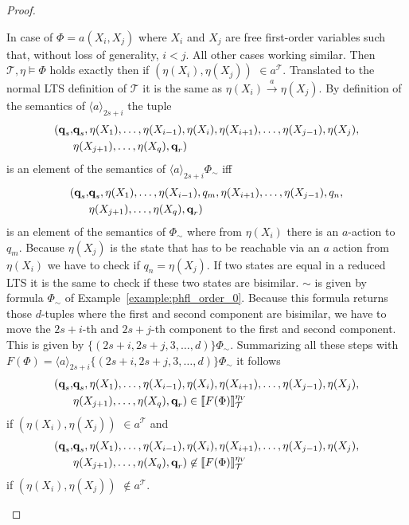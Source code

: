 \begin{proof}
\begin{compactitem}
        \item In case of $\Phi = a(X_i, X_j)$ where $X_i$ and $X_j$ are free first-order variables such that, without loss of generality, $i < j$. All other cases working similar. Then $\mathcal{T}, \eta \models \Phi$ holds exactly then if $(\eta(X_i)
        , \eta(X_j))$ $ \in a^\mathcal{T}$. Translated to the normal LTS definition of $\mathcal{T}$ it is the same as $
        \eta(X_i) \overset{a}{\rightarrow} \eta(X_j)$.
        By  definition of the semantics of $\langle a \rangle_{2s+i}$ the tuple
        \begin{align*}
            (\emph{q}_s, &\emph{q}_s, \eta(X_1), \dots, \eta(X_{i- 1}), \eta(X_{i}), \eta(X_{i+1}), \dots, \eta(X_{j-1}), \eta
            (X_{j}),\\& \eta(X_{j+1}), \dots, \eta(X_q), \emph{q}_r)
        \end{align*}
        is an element of the semantics of $\langle a \rangle_{2s+i} \Phi_\sim$ iff
        \begin{align*}
            (\emph{q}_s, &\emph{q}_s, \eta(X_1), \dots, \eta(X_{i - 1}), q_m, \eta(X_{i+1}), \dots, \eta(X_{j-1}), q_n,\\& \eta(X_{j
            +1}), \dots, \eta(X_q), \emph{q}_r)
        \end{align*}
        is an element of the semantics of $\Phi_\sim$ where from $\eta(X_i)$ there is an $a$-action to $q_m$. Because $\eta(X_j)$ is the state that
        has to be reachable via an $a$ action from $\eta(X_i)$ we have to check if $q_n = \eta(X_j)$. If two states are equal in a reduced LTS it is
        the same to check if these two states are bisimilar. $\sim$ is given by formula $\Phi_\sim$ of
        Example~\ref{example:phfl_order_0}.
        Because this formula returns those $d$-tuples where the first and second component are bisimilar, we have to
        move the $2s+i$-th and $2s+j$-th component to the first and second component. This is given by $\{(2s+i, 2s+j, 3, \dots, d
        )\} \Phi_\sim$. Summarizing all these steps with $F(\Phi) = \langle a \rangle_{2s+i} \{(2s+i, 2s+j, 3, \dots, d)\}
        \Phi_\sim$ it follows
        \begin{align*}
            (\emph{q}_s, &\emph{q}_s, \eta(X_1), \dots, \eta(X_{i - 1}), \eta(X_{i}), \eta(X_{i+1}), \dots, \eta(X_{j-1}), \eta
            (X_{j}),\\& \eta(X_{j+1}), \dots, \eta(X_q), \emph{q}_r) \in \llbracket F(\Phi) \rrbracket^{\eta_V}_\mathcal{T}
        \end{align*}
        if $(\eta(X_i), \eta(X_j))$ $ \in a^\mathcal{T}$ and
        \begin{align*}
            (\emph{q}_s, &\emph{q}_s, \eta(X_1), \dots, \eta(X_{i - 1}), \eta(X_{i}), \eta(X_{i+1}), \dots, \eta(X_{j-1}), \eta
            (X_{j}),\\& \eta(X_{j+1}), \dots, \eta(X_q), \emph{q}_r) \not\in \llbracket F(\Phi) \rrbracket^{\eta_V}_\mathcal{T}
        \end{align*}
        if $(\eta(X_i), \eta(X_j))$ $ \not\in a^\mathcal{T}$.


\end{compactitem}
\end{proof}
